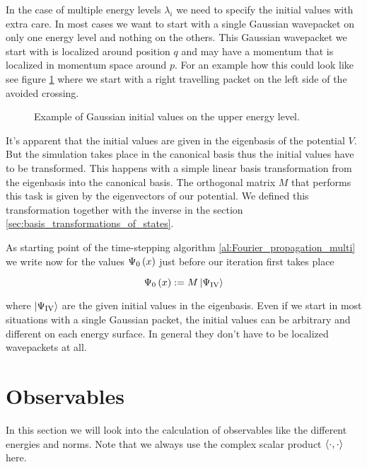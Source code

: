 In the case of multiple energy levels $\lambda_i$ we need to specify the initial
values with extra care. In most cases we want to start with a single Gaussian
wavepacket on only one energy level and nothing on the others. This Gaussian
wavepacket we start with is localized around position $q$ and may have a momentum
that is localized in momentum space around $p$. For an example how this
could look like see figure \ref{fig:initial_values_fourier} where we start with
a right travelling packet on the left side of the avoided crossing.

\begin{figure}
  \centering
  
  \caption{Example of Gaussian initial values on the upper energy level.}
  \label{fig:initial_values_fourier}
\end{figure}

It's apparent that the initial values are given in the eigenbasis of the potential
$V$. But the simulation takes place in the canonical basis thus the initial values
have to be transformed. This happens with a simple linear basis transformation
from the eigenbasis into the canonical basis. The orthogonal matrix $M$ that performs
this task is given by the eigenvectors of our potential. We defined this
transformation together with the inverse in the section \ref{sec:basis_transformations_of_states}.

As starting point of the time-stepping algorithm \eqref{al:Fourier_propagation_multi}
we write now for the values $\Psi_0\left( x \right)$ just before our iteration first takes place

\begin{equation}
  \Psi_0\left( x \right) := M \Ket{\Psi_{\text{IV}}}
\end{equation}

where $\Ket{\Psi_{\text{IV}}}$ are the given initial values in the eigenbasis. Even if
we start in most situations with a single Gaussian packet, the initial values can be
arbitrary and different on each energy surface. In general they don't have to be
localized wavepackets at all.


\section{Observables}

In this section we will look into the calculation of observables like the different
energies and norms. Note that we always use the complex scalar product $\langle \cdot , \cdot \rangle$
here.

